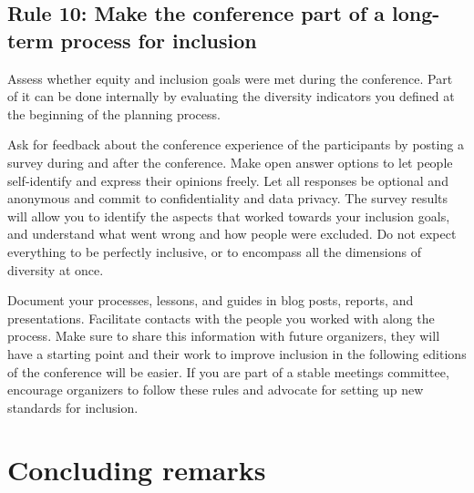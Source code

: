 \documentclass[10pt,letterpaper]{article}
\begin{document}
\subsection*{Rule 10: Make the conference part of a long-term process for inclusion}
\label{rule_process}

Assess whether equity and inclusion goals were met during the conference. 
Part of it can be done internally by evaluating the diversity indicators you defined at the beginning of the planning process. %
 
Ask for feedback about the conference experience of the participants by posting a survey during and after the conference. 
Make open answer options to let people self-identify and express their opinions freely. Let all responses be optional and anonymous and commit to confidentiality and data privacy. 
The survey results will allow you to identify the aspects that worked towards your inclusion goals, and understand what went wrong and how people were excluded.
Do not expect everything to be perfectly inclusive, or to encompass all the dimensions of diversity at once. %

Document your processes, lessons, and guides in blog posts, reports, and presentations. 
Facilitate contacts with the people you worked with along the process. 
Make sure to share this information with future organizers,
they will have a starting point and their work to improve inclusion in the following editions of the conference will be easier.
If you are part of a stable meetings committee, encourage organizers to follow these rules and advocate for setting up new standards for inclusion. 



\section*{Concluding remarks}
\end{document}
